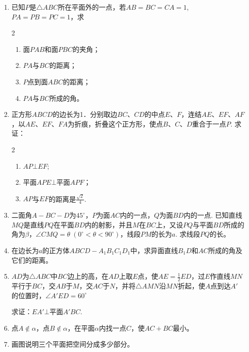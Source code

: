 \begin{enumerate}
 \item 已知$P$是$\triangle ABC$所在平面外的一点，若$AB=BC=CA=1$, $PA=PB=PC=1$，求
\begin{multicols}{2}
\begin{enumerate}[(1)]
\item 面$PAB$和面$PBC$的夹角；
\item $PA$与$BC$的距离；
\item $P$点到面$ABC$的距离；
\item $PA$与$BC$所成的角。
\end{enumerate}    
\end{multicols}

\item 正方形$ABCD$的边长为1．分别取边$BC$、$CD$的中点$E$、$F$，连结$AE$、$EF$、$AF$，以$AE$、$EF$、$FA$为折痕，折叠这个正方形，使点$B$、$C$、$D$重合于一点$P$. 求证：
\begin{multicols}{2}
\begin{enumerate}[(1)]
    \item $AP\bot EF$;
    \item 平面$APE\bot $平面$APF$；
    \item $AP$与$EF$的距离是$\frac{\sqrt{2}}{4}$.
\end{enumerate}
\end{multicols}

\item 二面角$A-BC-D$为$45^{\circ}$，$P$为面$AC$内的一点，$Q$为面$BD$内的一点. 已知直线$MQ$是直线$PQ$在平面$BD$内的射影，并且$M$在$BC$上，又设$PQ$与平面$BD$所成的角为$\beta$，$\angle CMQ=\theta\; (0^{\circ}<\theta<90^{\circ})$，线段$PM$的长为$a$. 求线段$PQ$的长。
\item 在边长为$a$的正方体$ABCD-A_1B_1C_1D_1$中，求异面直线$B_1D$和$AC$所成的角及它们的距离。
\item $AD$为$\triangle ABC$中$BC$边上的高，在$AD$上取$E$点，使$AE=\frac{1}{2}ED$，过$E$作直线$MN$平行于$BC$，交$AB$于$M$，交$AC$于$N$，并将$\triangle AMN$沿$MN$折起，使$A$点到达$A'$的位置时，$\angle A'ED=60^{\circ}$

求证：$EA'\bot $平面$A'BC$.
\item 点$A\notin \alpha$，点$B\notin \alpha$，在平面$\alpha$内找一点$C$，使$AC+BC$最小。
\item 画图说明三个平面把空间分成多少部分。

\end{enumerate}
